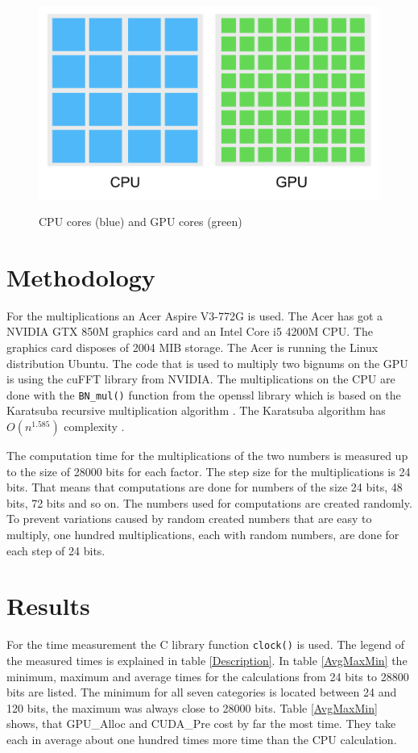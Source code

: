 \documentclass[12pt,a4paper]{article}
\begin{document}
\begin{figure}[hbt!]
\centering 
\caption{CPU cores (blue) and GPU cores (green)}
\includegraphics[scale=0.33]{cpugpu.png}
\label{cpu_gpu_cores} 
\end{figure}

\section{Methodology}
For the multiplications an Acer Aspire V3-772G is used. The Acer has got a NVIDIA GTX 850M graphics card and an Intel Core i5 4200M CPU. The graphics card disposes of 2004 MIB storage. The Acer is running the Linux distribution Ubuntu. The code that is used to multiply two bignums on the GPU is using the cuFFT library from NVIDIA. The multiplications on the CPU are done with the \texttt{BN_mul()} function from the openssl library which is based on the Karatsuba recursive multiplication algorithm \cite{young1995bnmul}. The Karatsuba algorithm has $O(n^{1.585})$ complexity \cite{dietzfelbinger2012eff}.

The computation time for the multiplications of the two numbers is measured up to the size of 28000 bits for each factor. The step size for the multiplications is 24 bits. That means that computations are done for numbers of the size 24 bits, 48 bits, 72 bits and so on. The numbers used for computations are created randomly. To prevent variations caused by random created numbers that are easy to multiply, one hundred multiplications, each with random numbers, are done for each step of 24 bits.

\section{Results}
For the time measurement the C library function \texttt{clock()} is used. The legend of the measured times is explained in table \ref{Description}. In table \ref{AvgMaxMin} the minimum, maximum and average times for the calculations from 24 bits to 28800 bits are listed. The minimum for all seven categories is located between 24 and 120 bits, the maximum was always close to 28000 bits. Table \ref{AvgMaxMin} shows, that GPU\_Alloc and CUDA\_Pre cost by far the most time. They take each in average about one hundred times more time than the CPU calculation.
\end{document}
